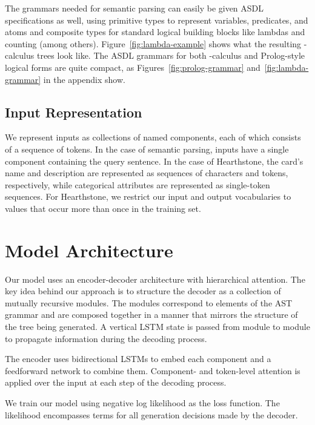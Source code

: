 \documentclass[11pt,a4paper]{article}
\newcommand{\HS}{{\sc Hearthstone}\xspace}
\begin{document}
The grammars needed for semantic parsing can easily be given ASDL specifications as well, using primitive types to represent variables, predicates, and atoms and composite types for standard logical building blocks like lambdas and counting (among others). Figure~\ref{fig:lambda-example} shows what the resulting -calculus trees look like. The ASDL grammars for both -calculus and Prolog-style logical forms are quite compact, as Figures~\ref{fig:prolog-grammar} and~\ref{fig:lambda-grammar} in the appendix show.

\subsection{Input Representation}

We represent inputs as collections of named components, each of which consists of a sequence of tokens. In the case of semantic parsing, inputs have a single component containing the query sentence. In the case of \HS, the card's name and description are
represented as sequences of characters and tokens, respectively, while categorical attributes are represented as single-token sequences. For \HS, we restrict our input and output vocabularies to values that occur more than once in the training set.



\section{Model Architecture}



Our model uses an encoder-decoder architecture with hierarchical attention. The key idea behind our approach is to structure the decoder as a collection of mutually recursive modules. The modules correspond to elements of the AST grammar and are composed together in a manner that mirrors the structure of the tree being generated. A vertical LSTM state is passed from module to module to propagate information during the decoding process.

The encoder uses bidirectional LSTMs to embed each component and a feedforward network to combine them. Component- and token-level attention is applied over the input at each step of the decoding process.

We train our model using negative log likelihood as the loss function. The likelihood encompasses terms for all generation decisions made by the decoder.
\end{document}
